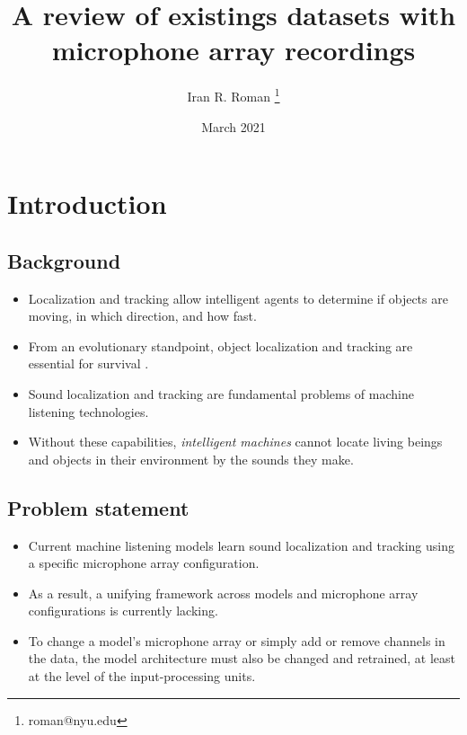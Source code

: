 \documentclass[14pt, oneside]{extarticle}
\title{A review of existings datasets with microphone array recordings}
\author{Iran R. Roman \thanks{roman@nyu.edu}}
\affil{Music and Audio Research Laboratory, New York University}
\date{March 2021}
\begin{document}
\maketitle
\tableofcontents

\vspace{.25in}

\section{Introduction}

\subsection{Background}

\begin{itemize}

\item Localization and tracking allow intelligent agents to determine if objects are moving, in which direction, and how fast. 

\item From an evolutionary standpoint, object localization and tracking are essential for survival \cite{heffner2018evolution}.

\item Sound localization and tracking are fundamental problems of machine listening technologies.

\item Without these capabilities, {\it intelligent machines} cannot locate living beings and objects in their environment by the sounds they make. 

\end{itemize}

\subsection{Problem statement}

\begin{itemize}

\item Current machine listening models learn sound localization and tracking using a specific microphone array configuration. 

\item As a result, a unifying framework across models and microphone array configurations is currently lacking. 

\item To change a model's microphone array or simply add or remove channels in the data, the model architecture must also be changed and retrained, at least at the level of the input-processing units.

\end{itemize}
\end{document}
